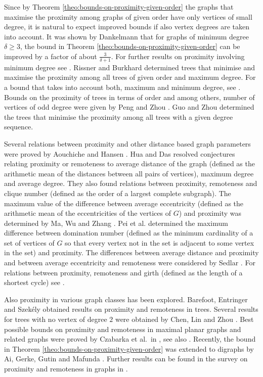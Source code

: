 \documentclass[a4paper,11pt]{article}
\numberwithin{equation}{theorem}
\begin{document}
Since by Theorem \ref{theo:bounds-on-proximity-given-order} the graphs that maximise the
proximity among graphs of given order have only vertices of small degree, it is natural
to expect improved bounds if also vertex degrees are taken into account. 
It was shown by Dankelmann \cite{Dan2015} that for graphs of minimum degree $\delta \geq 3$, the bound 
in Theorem \ref{theo:bounds-on-proximity-given-order} can be improved by a factor of 
about $\frac{3}{\delta+1}$. For further results on proximity involving minimum
degree see \cite{Dan2016, DanJonMaf2021, DanMaf2022}. 
Rissner and Burkhard \cite{RisBur2014} determined trees that minimise and maximise the proximity 
among all trees of given order and maximum degree. For a 
bound that takes into account both, maximum and minimum degree, see \cite{DanMafMal2022}. 
Bounds on the proximity of trees in terms of order and among others, number of vertices of odd degree 
were given by Peng and Zhou \cite{PenZho2021}.  
Guo and Zhou \cite{GuoZho2023} determined the trees that minimise the proximity
among all trees with a given degree sequence. 

Several relations between proximity and other distance based graph parameters 
were proved by Aouchiche and Hansen \cite{AouHan2011}. Hua and Das \cite{HuaDas2014} 
resolved conjectures relating proximity or remoteness to average distance of the graph
(defined as the arithmetic mean of  the distances between all pairs of vertices), maximum degree and average degree. They also found relations between proximity, remoteness and clique number 
(defined as the order of a largest complete subgraph).   
The maximum value of the difference between 
average eccentricity (defined as the arithmetic mean of the eccentricities of the vertices
of $G$) and proximity was determined by Ma, Wu and Zhang \cite{MaWuZha2012}.
Pei et al. \cite{PeiPanWanTia2021} determined the maximum difference between domination number (defined as the 
minimum cardinality of a set of vertices of $G$ so that every vertex not in the set is adjacent 
to some vertex in the set) and proximity.
The differences between average distance and proximity and between average eccentricity and 
remoteness were considered by Sedlar \cite{Sed2013}.
For relations between proximity, remoteness and girth (defined as the length of a shortest cycle) see  \cite{AouHan2017}.


Also proximity in various graph classes has been explored. 
Barefoot, Entringer and Szek\'{e}ly \cite{BarEntSze1997} obtained results on proximity and 
remoteness in trees. 
Several results for trees with no vertex of degree $2$ were obtained by 
Chen, Lin and Zhou \cite{CheLinZho2021}. 
Best possible bounds on proximity and remoteness in maximal planar graphs and related graphs 
were proved by Czabarka et al.\ in \cite{CzaDanOlsSze2021, CzaDanOlsSze2022},
see also \cite{DanMafMal-manu}. 
Recently, the bound in Theorem \ref{theo:bounds-on-proximity-given-order} was extended to digraphs by 
Ai, Gerke, Gutin and Mafunda \cite{AiGerGutMaf2021}.
Further results can be found in the survey on proximity and remoteness in graphs in \cite{AouRat2024}.
\end{document}
